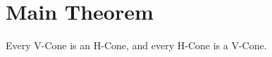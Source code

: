 \documentclass[a4,fleqn]{article}
\begin{document}






\section{Main Theorem}
\begin{theorem}{\label{theorem:mwt}
  Every V-Cone is an H-Cone, and every H-Cone is a V-Cone.
} \end{theorem}

%
%
%
%
%
%
%
%
%
%
%
%
%
\end{document}
